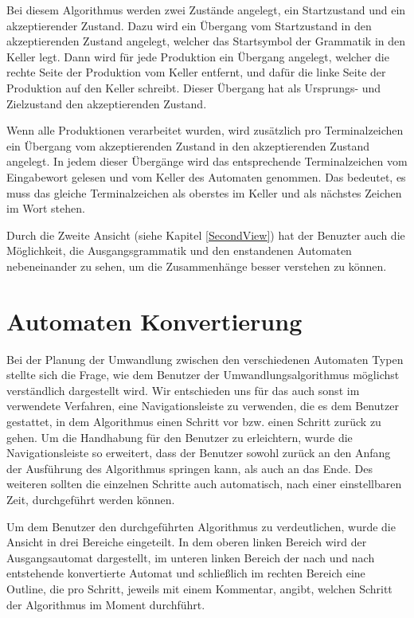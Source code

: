 Bei diesem Algorithmus werden zwei Zustände angelegt, ein Startzustand und ein
akzeptierender Zustand. Dazu wird ein Übergang vom Startzustand in den
akzeptierenden Zustand angelegt, welcher das Startsymbol der Grammatik in den
Keller legt. Dann wird für jede Produktion ein Übergang angelegt, welcher die rechte
Seite der Produktion vom Keller entfernt, und dafür die linke Seite der
Produktion auf den Keller schreibt. Dieser Übergang hat als
Ursprungs- und Zielzustand den akzeptierenden Zustand.\vspace{10pt}

Wenn alle Produktionen verarbeitet wurden, wird zusätzlich pro Terminalzeichen
ein Übergang vom akzeptierenden Zustand in den akzeptierenden Zustand angelegt.
In jedem dieser Übergänge wird das entsprechende Terminalzeichen vom Eingabewort
gelesen und vom Keller des Automaten genommen. Das bedeutet, es muss das gleiche
Terminalzeichen als oberstes im Keller  und als nächstes Zeichen im Wort
stehen.\vspace{10pt}

Durch die Zweite Ansicht (siehe Kapitel \ref{SecondView}) hat der Benuzter auch
die Möglichkeit, die Ausgangsgrammatik und den enstandenen Automaten
nebeneinander zu sehen, um die Zusammenhänge besser verstehen zu können.\vspace{10pt}


\section{Automaten Konvertierung}\label{ConverToMachine}

Bei der Planung der Umwandlung zwischen den verschiedenen Automaten Typen stellte
sich die Frage, wie dem Benutzer der Umwandlungsalgorithmus möglichst
verständlich dargestellt wird. Wir entschieden uns für das auch sonst im \gtitool
verwendete Verfahren, eine Navigationsleiste zu verwenden, die es dem Benutzer
gestattet, in dem Algorithmus einen Schritt vor bzw. einen Schritt zurück zu
gehen. Um die Handhabung für den Benutzer zu erleichtern, wurde die
Navigationsleiste so erweitert, dass der Benutzer sowohl zurück an den Anfang der
Ausführung des Algorithmus springen kann, als auch an das Ende. Des weiteren
sollten die einzelnen Schritte auch automatisch, nach einer einstellbaren Zeit,
durchgeführt werden können.\vspace{10pt}

Um dem Benutzer den durchgeführten Algorithmus zu verdeutlichen, wurde die
Ansicht in drei Bereiche eingeteilt. In dem oberen linken Bereich wird der
Ausgangsautomat dargestellt, im unteren linken Bereich der nach und nach
entstehende konvertierte Automat und schließlich im rechten Bereich eine
Outline, die pro Schritt, jeweils mit einem Kommentar, angibt, welchen Schritt
der Algorithmus im Moment durchführt.\vspace{10pt}

